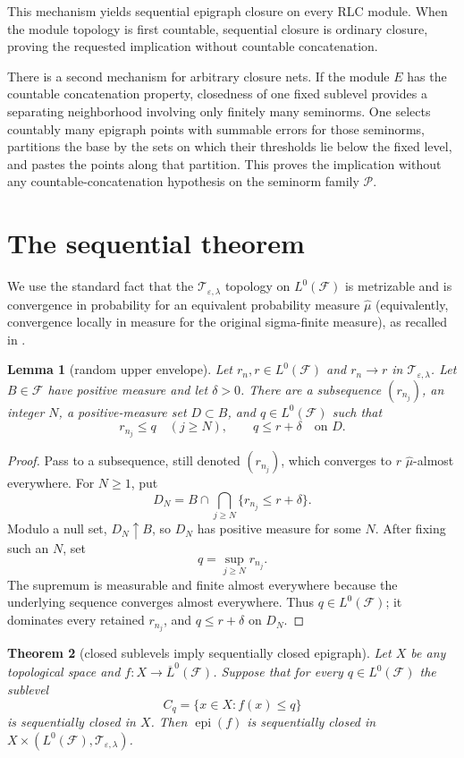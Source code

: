 \documentclass[11pt]{article}
\newtheorem{theorem}{Theorem}
\newtheorem{lemma}[theorem]{Lemma}
\newcommand{\Lzero}{L^0(\mathcal F)}
\newcommand{\Tep}{\mathcal T_{\varepsilon,\lambda}}
\newcommand{\epi}{\operatorname{epi}}
\begin{document}
This mechanism yields sequential epigraph closure on every RLC module.  When
the module topology is first countable, sequential closure is ordinary
closure, proving the requested implication without countable concatenation.

There is a second mechanism for arbitrary closure nets.  If the module $E$
has the countable concatenation property, closedness of one fixed sublevel
provides a separating neighborhood involving only finitely many seminorms.
One selects countably many epigraph points with summable errors for those
seminorms, partitions the base by the sets on which their thresholds lie
below the fixed level, and pastes the points along that partition.  This proves
the implication without any countable-concatenation hypothesis on the
seminorm family $\mathcal P$.

\section{The sequential theorem}

We use the standard fact that the $\Tep$ topology on $\Lzero$ is metrizable
and is convergence in probability for an equivalent probability measure
$\widehat\mu$ (equivalently, convergence locally in measure for the original
sigma-finite measure), as recalled in \cite[Section 2]{GuoEtAl}.

\begin{lemma}[random upper envelope]
\label{lem:envelope}
Let $r_n,r\in\Lzero$ and $r_n\to r$ in $\Tep$.  Let $B\in\mathcal F$ have
positive measure and let $\delta>0$.  There are a subsequence
$(r_{n_j})$, an integer $N$, a positive-measure set $D\subset B$, and
$q\in\Lzero$ such that
\[
r_{n_j}\leq q\quad(j\geq N),
\qquad q\leq r+\delta\quad\text{on }D.
\]
\end{lemma}

\begin{proof}
Pass to a subsequence, still denoted $(r_{n_j})$, which converges to $r$
$\widehat\mu$-almost everywhere.  For $N\geq1$, put
\[
D_N=B\cap\bigcap_{j\geq N}\{r_{n_j}\leq r+\delta\}.
\]
Modulo a null set, $D_N\uparrow B$, so $D_N$ has positive measure for some
$N$.  After fixing such an $N$, set
\[
q=\sup_{j\geq N}r_{n_j}.
\]
The supremum is measurable and finite almost everywhere because the
underlying sequence converges almost everywhere.  Thus $q\in\Lzero$; it
dominates every retained $r_{n_j}$, and $q\leq r+\delta$ on $D_N$.
\end{proof}

\begin{theorem}[closed sublevels imply sequentially closed epigraph]
\label{thm:sequential}
Let $X$ be any topological space and
$f:X\to\overline L^0(\mathcal F)$.  Suppose that for every $q\in\Lzero$ the
sublevel
\[
C_q=\{x\in X:f(x)\leq q\}
\]
is sequentially closed in $X$.  Then $\epi(f)$ is sequentially closed in
$X\times(\Lzero,\Tep)$.
\end{theorem}
\end{document}
